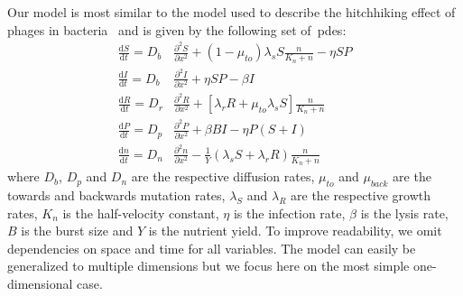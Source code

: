 Our model is most similar to the model used to describe the hitchhiking effect of phages in bacteria~\cite{Ping2020-vd} and is given by the following set of~\gls{pde}s:
\begin{align}
    \frac{\text{d}S}{\text{d}t} = D_b &\frac{\partial^2S}{\partial x^2} + \left( 1 - \mu_{to} \right) \lambda_s S \frac{n}{K_n+n}  - \eta SP \\
    \frac{\text{d}I}{\text{d}t} = D_b &\frac{\partial^2I}{\partial x^2} + \eta SP - \beta I\\
    \frac{\text{d}R}{\text{d}t} = D_r &\frac{\partial^2R}{\partial x^2} + \left[\lambda_r R + \mu_{to} \lambda_s S \right] \frac{n}{K_n+n}\\
    \frac{\text{d}P}{\text{d}t} = D_p &\frac{\partial^2P}{\partial x^2} + \beta BI - \eta P(S+I) \\
    \frac{\text{d}n}{\text{d}t} = D_n &\frac{\partial^2n}{\partial x^2} - \frac{1}{Y} \left( \lambda_s S + \lambda_r R \right) \frac{n}{K_n+n}
\end{align}
where $D_b$, $D_p$ and $D_n$ are the respective diffusion rates, $\mu_{to}$ and $\mu_{back}$ are the towards and backwards mutation rates, $\lambda_S$ and $\lambda_R$ are the respective growth rates, $K_n$ is the half-velocity constant, $\eta$ is the infection rate, $\beta$ is the lysis rate, $B$ is the burst size and $Y$ is the nutrient yield. To improve readability, we omit dependencies on space and time for all variables. The model can easily be generalized to multiple dimensions but we focus here on the most simple one-dimensional case.

